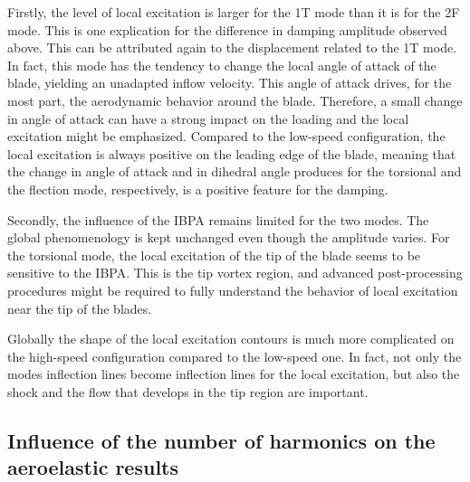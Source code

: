 Firstly, the level of local excitation is larger for the
1T mode than it is for the 2F mode. This is one explication
for the difference in damping amplitude observed above.
This can be attributed again to the displacement related to the
1T mode. In fact, this mode has the tendency to change the
local angle of attack of the blade, yielding an unadapted
inflow velocity. This angle of attack drives, for the most part,
the aerodynamic behavior around the blade. Therefore, a small
change in angle of attack can have a strong impact on the loading and
the local excitation might be emphasized.
Compared to the low-speed configuration, the local excitation
is always positive on the leading edge of the blade, meaning
that the change in angle of attack and in dihedral angle
produces for the torsional and the flection mode, respectively,
is a positive feature for the damping.

Secondly, the influence of the IBPA remains limited for the
two modes. The global phenomenology is
kept unchanged even though the amplitude varies.
For the torsional mode, the local excitation of
the tip of the blade seems to be sensitive 
to the IBPA. This is the tip vortex region, and
advanced post-processing procedures might be required
to fully understand the behavior of local excitation
near the tip of the blades.

Globally the shape of the local excitation contours
is much more complicated on the high-speed configuration
compared to the low-speed one. In fact, 
not only the modes inflection lines become inflection lines
for the local excitation, but also the shock and 
the flow that develops in the tip region are important.

\subsection{Influence of the number of harmonics on the aeroelastic results}
\label{sub:dream_hs_convergence_ael}

